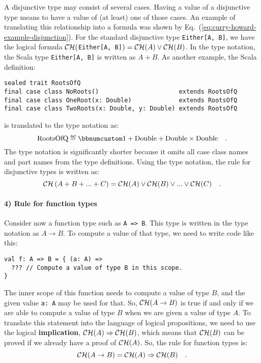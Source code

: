 A disjunctive type may consist of several cases. Having a value of
a disjunctive type means to have a value of (at least) one of those
cases. An example of translating this relationship into a formula
was shown by Eq.~(\ref{eq:curry-howard-example-disjunction}). For
the standard disjunctive type \lstinline!Either[A, B]!, we have the
logical formula ${\cal CH}($\lstinline!Either[A, B]!$)={\cal CH}(A)\vee{\cal CH}(B)$.
In the type notation, the Scala type \lstinline!Either[A, B]! is
written as $A+B$. As another example, the Scala definition:
\begin{lstlisting}
sealed trait RootsOfQ
final case class NoRoots()                      extends RootsOfQ
final case class OneRoot(x: Double)             extends RootsOfQ
final case class TwoRoots(x: Double, y: Double) extends RootsOfQ
\end{lstlisting}
is translated to the type notation as:
\[
\text{RootsOfQ}\triangleq\bbnum 1+\text{Double}+\text{Double}\times\text{Double}\quad.
\]
The type notation is significantly shorter because it omits all case
class names and part names from the type definitions. Using the type
notation, the rule for disjunctive types is written as:
\[
{\cal CH}\left(A+B+...+C\right)={\cal CH}(A)\vee{\cal CH}(B)\vee...\vee{\cal CH}(C)\quad.
\]


\paragraph{4) Rule for function types}

Consider now a function type such as \lstinline!A => B!. This type
is written in the type notation as $A\rightarrow B$. To compute a
value of that type, we need to write code like this:
\begin{lstlisting}
val f: A => B = { (a: A) =>
  ??? // Compute a value of type B in this scope.
}
\end{lstlisting}
The inner scope of this function needs to compute a value of type
$B$, and the given value \lstinline!a: A! may be used for that.
So, ${\cal CH}(A\rightarrow B)$ is true if and only if we are able
to compute a value of type $B$ when we are given a value of type
$A$. To translate this statement into the language of logical propositions,
we need to use the logical \textbf{implication},
${\cal CH}(A)\Rightarrow{\cal CH}(B)$, which means that ${\cal CH}(B)$
can be proved if we already have a proof of ${\cal CH}(A)$. So, the
rule for function types is:
\[
{\cal CH}(A\rightarrow B)={\cal CH}(A)\Rightarrow{\cal CH}(B)\quad.
\]


